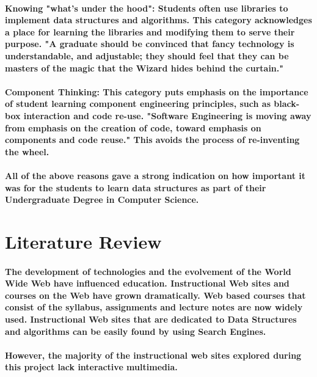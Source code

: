 \documentclass{article}
\begin{document}
\paragraph{Knowing "what's under the hood": Students often use libraries to implement data structures and algorithms. This category acknowledges a place for learning the libraries and modifying them to serve their purpose. "A graduate should be convinced that fancy technology is understandable, and adjustable; they should feel that they can be masters of the magic that the Wizard hides behind the curtain."}

\paragraph{Component Thinking: This category puts emphasis on the importance of student learning component engineering principles, such as black-box interaction and code re-use. "Software Engineering is moving away from emphasis on the creation of code, toward emphasis on components and code reuse." This avoids the process of re-inventing the wheel.}
\paragraph{All of the above reasons gave a strong indication on how important it was for the students to learn data structures as part of their Undergraduate Degree in Computer Science.}

\section{Literature Review}
\paragraph{The development of technologies and the evolvement of the World Wide Web have influenced education. Instructional Web sites and courses on the Web have grown dramatically. Web based courses that consist of the syllabus, assignments and lecture notes are now widely used. Instructional Web sites that are dedicated to Data Structures and algorithms can be easily found by using Search Engines. }
\paragraph{However, the majority of the instructional web sites explored during this project lack interactive multimedia.}
\end{document}
